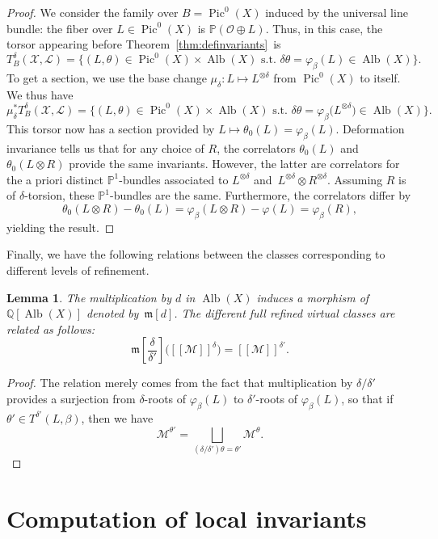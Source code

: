 \documentclass[11pt]{article}
\numberwithin{equation}{section}
\newcommand{\fvir}[2]{[\![ #1 ]\!]^{#2}}
\newcommand{\m}[1]{\mfk\left[ #1 \right]}
\newcommand{\Pic}{\operatorname{Pic}}
\newcommand{\Alb}{\operatorname{Alb}}
\newcommand{\PP}{\mathbb{P}}
\newcommand{\QQ}{\mathbb{Q}}
\newcommand{\mfk}{\mathfrak{m}}
\renewcommand{\L}{\mathcal{L}}
\newcommand{\M}{\mathcal{M}}
\newcommand{\X}{\mathcal{X}}
\renewcommand{\O}{\mathcal{O}}
\numberwithin{equation}{section}
\newtheorem{lem}[theo]{Lemma}
\theoremstyle{definition}
\begin{document}
\begin{proof}
We consider the family over $B=\Pic^0(X)$ induced by the universal line bundle: the fiber over $L\in\Pic^0(X)$ is $\PP(\O\oplus L)$. Thus, in this case, the torsor appearing before Theorem~\ref{thm:definvariants}~is
\[ T^\delta_B(\X,\L) = \big\{ (L,\theta)\in\Pic^0(X)\times\Alb(X) \text{ s.t. } \delta\theta=\varphi_\beta(L)\in\Alb(X)\big\}.
 \]
To get a section, we use the base change $\mu_\delta\colon L\mapsto L^{\otimes\delta}$ from $\Pic^0(X)$ to itself. We thus have
\[ \mu_\delta^*T^\delta_B(\X,\L) = \big\{ (L,\theta)\in\Pic^0(X)\times\Alb(X) \text{ s.t. } \delta\theta=\varphi_\beta\bigl(L^{\otimes\delta}\bigr)\in\Alb(X)\big\}. \]
This torsor now has a section provided by $L\mapsto\theta_0(L)=\varphi_\beta(L)$.
Deformation invariance tells us that for any choice of $R$, the correlators $\theta_0(L)$ and $\theta_0(L\otimes R)$ provide the same invariants. However, the latter are correlators for the a priori distinct $\PP^1$-bundles associated to $L^{\otimes\delta}$ and~${L^{\otimes\delta}\otimes R^{\otimes\delta}}$. Assuming $R$ is of $\delta$-torsion, these $\PP^1$-bundles are the same. Furthermore, the correlators differ by
\[ \theta_0(L\otimes R)-\theta_0(L) = \varphi_\beta(L\otimes R)-\varphi(L)=\varphi_\beta(R), \]
yielding the result.
\end{proof}

Finally, we have the following relations between the classes corresponding to different levels of refinement.

\begin{lem}\label{lem-unrefinement}
The multiplication by $d$ in $\Alb(X)$ induces a morphism of $\QQ[\Alb(X)]$ denoted by~$\m{d}$. The different full refined virtual classes are related as follows:
\[ \m{\frac{\delta}{\delta'}}\bigl(\fvir{\M}{\delta}\bigr) = \fvir{\M}{\delta'}. \]
\end{lem}

\begin{proof}
 The relation merely comes from the fact that multiplication by $\delta/\delta'$ provides a surjection from $\delta$-roots of $\varphi_\beta(L)$ to $\delta'$-roots of $\varphi_\beta(L)$, so that if $\theta'\in T^{\delta'}(L,\beta)$, then we have
 \[ \M^{\theta'}=\bigsqcup_{(\delta/\delta')\theta=\theta'}\M^{\theta}. \tag*{\qed}
 \]\renewcommand{\qed}{}
\end{proof}


\setcounter{section}{4}
\section{Computation of local invariants}
\label{sec-computation-local-invariants}
\end{document}
